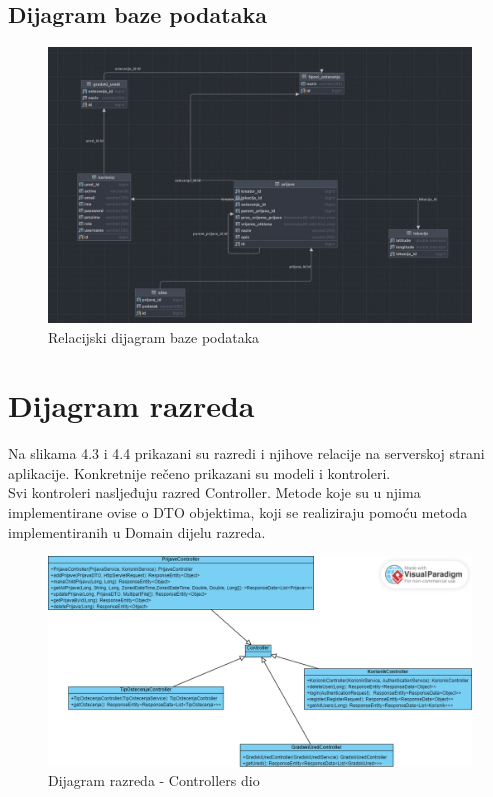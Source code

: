 			\subsection{Dijagram baze podataka}
				\begin{figure}[H]
			\includegraphics[scale=0.3]{slike/erBaza.PNG} %
			\centering
			\caption{Relacijski dijagram baze podataka}
			\label{fig:bazapod}
		\end{figure}
			
			\eject
			
			
		\section{Dijagram razreda}
		
			Na slikama 4.3 i 4.4 prikazani su razredi i njihove relacije na serverskoj strani aplikacije. Konkretnije rečeno prikazani su modeli i kontroleri. \\
			
			Svi kontroleri nasljeđuju razred Controller. Metode koje su u njima implementirane ovise o DTO objektima, koji se realiziraju pomoću metoda implementiranih u Domain dijelu razreda.
			
			
				\begin{figure}[H]
			\includegraphics[scale=0.3]{slike/kontroleri.PNG} %
			\centering
			\caption{Dijagram razreda - Controllers dio}
			\label{fig:bazapod}
		\end{figure}
		
